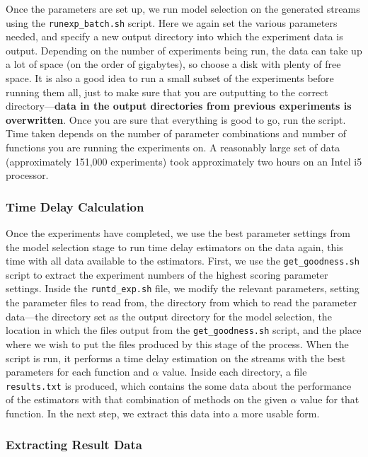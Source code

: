 \documentclass[a4paper,11pt]{article}
\begin{document}
\begin{appendices}
    Once the parameters are set up, we run model selection on the generated streams
    using the \texttt{runexp\_batch.sh} script. Here we again set the various
    parameters needed, and specify a new output directory into which the experiment
    data is output. Depending on the number of experiments being run, the data can
    take up a lot of space (on the order of gigabytes), so choose a disk with plenty
    of free space. It is also a good idea to run a small subset of the experiments
    before running them all, just to make sure that you are outputting to the
    correct directory---\textbf{data in the output directories from previous
    experiments is overwritten}. Once you are sure that everything is good to go,
    run the script. Time taken depends on the number of parameter combinations and
    number of functions you are running the experiments on. A reasonably large set
    of data (approximately 151,000 experiments) took approximately two hours on an
    Intel i5 processor.
\subsubsection{Time Delay Calculation}
\label{sec-10-3-5}

    Once the experiments have completed, we use the best parameter settings from the
    model selection stage to run time delay estimators on the data again, this time
    with all data available to the estimators. First, we use the
    \texttt{get\_goodness.sh} script to extract the experiment numbers of the
    highest scoring parameter settings. Inside the \texttt{runtd\_exp.sh} file, we
    modify the relevant parameters, setting the parameter files to read from, the
    directory from which to read the parameter data---the directory set as the
    output directory for the model selection, the location in which the files output
    from the \texttt{get\_goodness.sh} script, and the place where we wish to put
    the files produced by this stage of the process. When the script is run, it
    performs a time delay estimation on the streams with the best parameters for
    each function and $\alpha$ value. Inside each directory, a file
    \texttt{results.txt} is produced, which contains the some data about the
    performance of the estimators with that combination of methods on the given
    $\alpha$ value for that function. In the next step, we extract this data into a
    more usable form.
\subsubsection{Extracting Result Data}
\label{sec-10-3-6}


\end{appendices}
\end{document}
